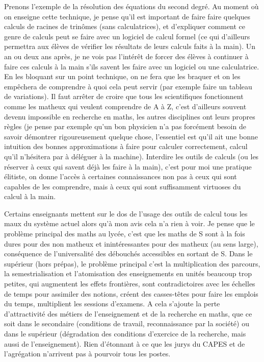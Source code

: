 \documentclass[a4paper,11pt]{article}
\begin{document}
\begin{giacjshere}
Prenons l'exemple de la r\'esolution des \'equations du second
degr\'e. Au moment o\`u on enseigne cette technique, je pense
qu'il est important de faire faire quelques calculs de racines 
de trin\^omes (sans
calculatrices), et d'expliquer comment ce genre de calculs peut
se faire avec un logiciel de calcul formel (ce qui d'ailleurs
permettra aux \'el\`eves de v\'erifier les r\'esultats
de leurs calculs faits \`a la main).
Un an ou deux ans apr\`es, je ne vois pas l'int\'er\^et de forcer
des \'el\`eves \`a continuer \`a faire ces calculs \`a la main
s'ils savent les faire avec un logiciel ou une calculatrice. En les
bloquant sur un point technique, on ne fera
que les braquer et on les emp\^echera de comprendre \`a quoi
cela peut servir (par exemple faire un tableau de variations).
Il faut arr\^eter de croire que tous les
scientifiques fonctionnent comme les matheux qui veulent
comprendre de A \`a Z, c'est d'ailleurs souvent devenu
impossible en recherche en maths, les autres disciplines
ont leurs propres r\`egles (je pense par exemple qu'un
bon physicien n'a pas forc\'ement besoin de savoir
d\'emontrer rigoureusement quelque chose, l'essentiel
est qu'il ait une bonne intuition des bonnes approximations
\`a faire pour calculer correctement, calcul qu'il n'h\'esitera
par \`a d\'el\'eguer \`a la machine). Interdire les outils
de calculs (ou les r\'eserver \`a ceux qui savent d\'ej\`a
les faire \`a la main), c'est pour moi une pratique \'elitiste,
on donne l'acc\`es \`a certaines connaissances non pas
\`a ceux qui sont capables de les comprendre, mais \`a
ceux qui sont suffisamment virtuoses du calcul \`a la main.

Certains enseignants mettent sur le dos de l'usage des outils de
calcul tous les maux du syst\`eme actuel alors qu'\`a mon avis cela n'a rien
\`a voir. Je pense que le probl\`eme principal des maths au lyc\'ee, 
c'est que les maths de S sont \`a la fois dures pour des non matheux
et inint\'eressantes pour des matheux (au sens large), cons\'equence
de l'universalit\'e des d\'ebouch\'es accessibles en sortant de S.
Dans le sup\'erieur (hors pr\'epas), le probl\`eme principal c'est
la multiplication des parcours, la semestrialisation 
et l'atomisation des enseignements
en unit\'es beaucoup trop petites, qui augmentent les effets
fronti\`eres, sont contradictoires avec les \'echelles de temps
pour assimiler des notions, cr\'eent des casses-t\^etes pour faire
les emplois du temps, multiplient les sessions d'examens. 
A cela s'ajoute la perte d'attractivit\'e des m\'etiers de
l'enseignement et de la recherche en maths, que ce soit
dans le secondaire (conditions de travail, reconnaissance
par la soci\'et\'e) ou dans le sup\'erieur (d\'egradation
des conditions d'exercice de la recherche, mais aussi
de l'enseignement). Rien d'\'etonnant \`a ce que les jurys
du CAPES et de l'agr\'egation n'arrivent pas \`a
pourvoir tous les postes.


\end{giacjshere}
\end{document}
